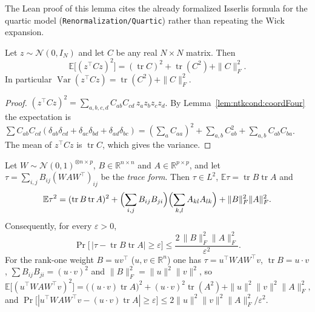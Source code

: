 The Lean proof of this lemma cites the already formalized Isserlis formula for the quartic model (\texttt{Renormalization/Quartic}) rather than repeating the Wick expansion.

\begin{theorem}\label{thm:ntkcond:stdQuad}
  \leanok
Let $z\sim\mathcal N(0,I_N)$ and let $C$ be any real $N\times N$ matrix. Then
\[
  \mathbb E\bigl[(z^\top Cz)^2\bigr]=(\operatorname{tr}C)^2+\operatorname{tr}(C^2)+\|C\|_F^2 .
\]
In particular $\operatorname{Var}(z^\top Cz)=\operatorname{tr}(C^2)+\|C\|_F^2$.
\end{theorem}

\begin{proof}
  \leanok
$(z^\top Cz)^2=\sum_{a,b,c,d}C_{ab}C_{cd}\,z_az_bz_cz_d$. By Lemma~\ref{lem:ntkcond:coordFour} the expectation is
$\sum C_{ab}C_{cd}(\delta_{ab}\delta_{cd}+\delta_{ac}\delta_{bd}+\delta_{ad}\delta_{bc})
=(\sum_aC_{aa})^2+\sum_{a,b}C_{ab}^2+\sum_{a,b}C_{ab}C_{ba}$. The mean of $z^\top Cz$ is $\operatorname{tr}C$, which gives the variance.
\end{proof}

\begin{theorem}\label{thm:ntkcond:sandwichVariance}
  \leanok
Let $W\sim\mathcal N(0,1)^{\otimes n\times p}$, $B\in\mathbb R^{n\times n}$ and $A\in\mathbb R^{p\times p}$, and let $\tau=\sum_{i,j}B_{ij}(WAW^\top)_{ij}$ be the \emph{trace form}. Then $\tau\in L^2$, $\mathbb E\tau=\operatorname{tr}B\operatorname{tr}A$ and
\[
  \mathbb E\tau^2=(\operatorname{tr}B\operatorname{tr}A)^2+\Bigl(\sum_{i,j}B_{ij}B_{ji}\Bigr)\Bigl(\sum_{k,l}A_{kl}A_{lk}\Bigr)+\|B\|_F^2\|A\|_F^2 .
\]
Consequently, for every $\varepsilon>0$,
\[
  \Pr\bigl[\,|\tau-\operatorname{tr}B\operatorname{tr}A|\ge\varepsilon\bigr]\le\frac{2\,\|B\|_F^2\|A\|_F^2}{\varepsilon^2}.
\]
For the rank-one weight $B=uv^\top$ ($u,v\in\mathbb R^n$) one has $\tau=u^\top WAW^\top v$, $\operatorname{tr}B=u\cdot v$, $\sum B_{ij}B_{ji}=(u\cdot v)^2$ and $\|B\|_F^2=\|u\|^2\|v\|^2$, so
\[
  \mathbb E\bigl[(u^\top WAW^\top v)^2\bigr]=\bigl((u\cdot v)\operatorname{tr}A\bigr)^2+(u\cdot v)^2\operatorname{tr}(A^2)+\|u\|^2\|v\|^2\|A\|_F^2,
\]
and $\Pr\bigl[|u^\top WAW^\top v-(u\cdot v)\operatorname{tr}A|\ge\varepsilon\bigr]\le2\|u\|^2\|v\|^2\|A\|_F^2/\varepsilon^2$.
\end{theorem}

